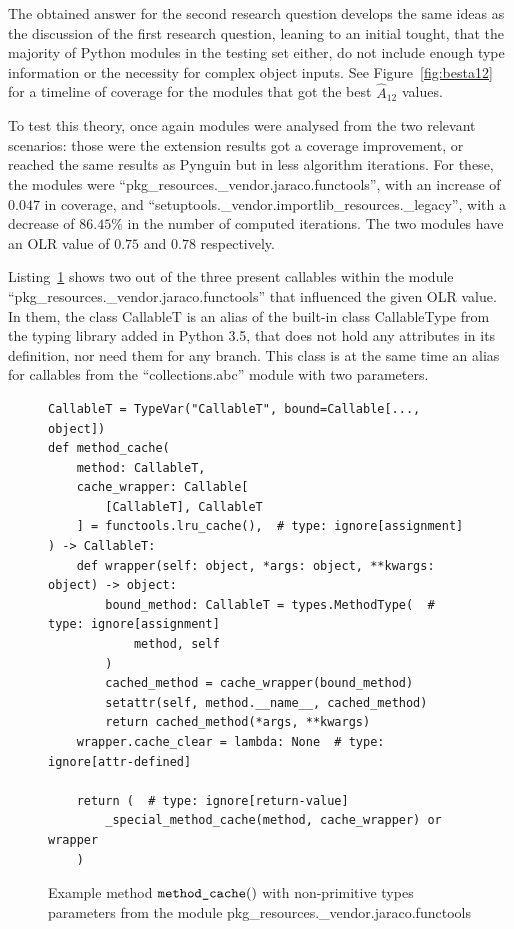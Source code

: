 \documentclass[%
  chapterprefix=false,%
  open=right,%
  twoside=true,%
  paper=a4,%
  logofile={Figures/logo.png},%
  thesistype=master,%
  UKenglish,%
]{se2thesis}
\newcommand{\callable}[2][]{\(\text{\texttt{#2}}(#1)\)}
\begin{document}
The obtained answer for the second research question develops the same ideas as the discussion of the first research question, leaning to an initial tought, that the majority of Python modules in the testing set either, do not include enough type information or the necessity for complex object inputs. 
See Figure~\ref{fig:besta12} for a timeline of coverage for the modules that got the best \(\hat{A}_{12}\) values.

To test this theory, once again modules were analysed from the two relevant scenarios: those were the extension results got a coverage improvement, or reached the same results as Pynguin but in less algorithm iterations.
For these, the modules were ``pkg\_resources.\_vendor.jaraco.functools'', with an increase of \(0.047\) in coverage, and ``setuptools.\_vendor.importlib\_resources.\_legacy'', with a decrease of \(86.45\%\) in the number of computed iterations.
The two modules have an OLR value of \(0.75\) and \(0.78\) respectively.

Listing~\ref{lst:10} shows two out of the three present callables within the module ``pkg\_resources.\_vendor.jaraco.functools'' that influenced the given OLR value.
In them, the class CallableT is an alias of the built-in class CallableType from the typing library added in Python 3.5, that does not hold any attributes in its definition, nor need them for any branch.
This class is at the same time an alias for callables from the ``collections.abc'' module with two parameters. 

\begin{figure}
\begin{verbatim}
CallableT = TypeVar("CallableT", bound=Callable[..., object])
def method_cache(
    method: CallableT,
    cache_wrapper: Callable[
        [CallableT], CallableT
    ] = functools.lru_cache(),  # type: ignore[assignment]
) -> CallableT:
    def wrapper(self: object, *args: object, **kwargs: object) -> object:
        bound_method: CallableT = types.MethodType(  # type: ignore[assignment]
            method, self
        )
        cached_method = cache_wrapper(bound_method)
        setattr(self, method.__name__, cached_method)
        return cached_method(*args, **kwargs)
    wrapper.cache_clear = lambda: None  # type: ignore[attr-defined]

    return (  # type: ignore[return-value]
        _special_method_cache(method, cache_wrapper) or wrapper
    )
\end{verbatim}
\caption{Example method \callable[]{method\_cache} with non-primitive types parameters from the module pkg\_resources.\_vendor.jaraco.functools}\label{lst:10}
\end{figure}
\end{document}
